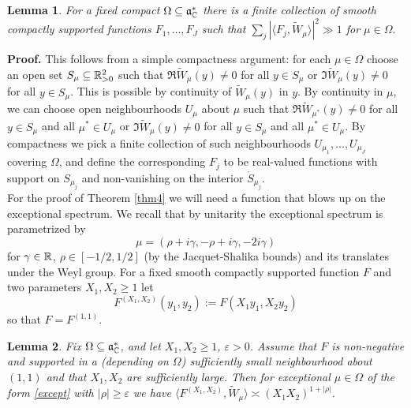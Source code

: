 \documentclass[11pt]{amsart}
\theoremstyle{plain}
\newtheorem{lemma}{Lemma}
\numberwithin{equation}{section}
\theoremstyle{definition}
\renewcommand{\geq}{\geqslant}
\begin{document}
\begin{lemma}\label{omega} For a fixed compact $\Omega \subseteq \mathfrak{a}_{\Bbb{C}}^{\ast}$ there is a finite collection of smooth compactly supported functions $F_1, \ldots, F_J$ such that $\sum_j |\langle F_j, \tilde{W}_{\mu}\rangle|^2 \gg 1$ for $\mu \in \Omega.$ 
\end{lemma}

\textbf{Proof.} This follows from a simple compactness argument: for each $\mu \in \Omega$ choose an open set $S_{\mu} \subseteq \Bbb{R}_{>0}^2$ such that $\Re \tilde{W}_{\mu}(y) \not= 0$ for all $y \in S_{\mu}$ or  $\Im \tilde{W}_{\mu}(y)\not= 0$  for all $y \in S_{\mu}$. This is possible by continuity of $\tilde{W}_{\mu}(y)$ in $y$. By continuity in $\mu$, we can choose open neighbourhoods $U_{\mu}$ about $\mu$ such that  $\Re \tilde{W}_{\mu^{\ast}}(y) \not= 0$ for all $y \in S_{\mu}$ and all $\mu^{\ast} \in U_{\mu}$ or  $\Im \tilde{W}_{\mu}(y)\not= 0$  for all $y \in S_{\mu}$ and all $\mu^{\ast} \in U_{\mu}$. By compactness we pick a finite collection  of such neighbourhoods $U_{\mu_1}, \ldots, U_{\mu_J}$ covering $\Omega$, and define the corresponding $F_j$ to be real-valued functions with support on $S_{\mu_j}$ and non-vanishing on the interior $\mathring{S}_{\mu_j}$.    \\

For the proof of Theorem \ref{thm4} we will  need a function that blows up on the exceptional spectrum. We recall that by unitarity the exceptional spectrum is parametrized by 
\begin{equation}\label{except}
\mu = (\rho + i\gamma, - \rho + i \gamma, -2i\gamma)
\end{equation}
for $\gamma \in \Bbb{R}$, $\rho \in [-1/2, 1/2]$ (by the Jacquet-Shalika bounds) %
   and its translates under the Weyl group. For a fixed smooth compactly supported function $F$ and two parameters $X_1, X_2 \geq 1$ let
 \begin{equation}\label{shift}  
   F^{(X_1, X_2)}(y_1, y_2) := F(X_1y_1, X_2 y_2)
   \end{equation} 
   so that $F = F^{(1, 1)}$. 

 \begin{lemma}\label{X} Fix $\Omega  \subseteq \mathfrak{a}_{\Bbb{C}}^{\ast}$, and let $X_1, X_2 \geq 1$, $\varepsilon > 0$.  Assume that $F$ is non-negative and supported  in a (depending on $\Omega$) sufficiently small neighbourhood about $(1, 1)$ and that $X_1, X_2$ are sufficiently large.  Then for exceptional $\mu \in \Omega$ of the form \eqref{except} with $|\rho| \geq \varepsilon$ we have
$\langle F^{(X_1, X_2)}, \tilde{W}_{\mu} \rangle \asymp (X_1X_2)^{1+|\rho|}$.   
\end{lemma} 
   
\end{document}
